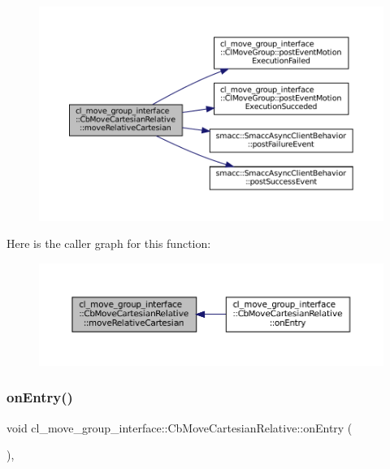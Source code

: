 \begin{figure}[H]
\begin{center}
\leavevmode
\includegraphics[width=350pt]{classcl__move__group__interface_1_1CbMoveCartesianRelative_ae8443c7f81affe5c4450e83fc665487f_cgraph}
\end{center}
\end{figure}
Here is the caller graph for this function\+:
\nopagebreak
\begin{figure}[H]
\begin{center}
\leavevmode
\includegraphics[width=350pt]{classcl__move__group__interface_1_1CbMoveCartesianRelative_ae8443c7f81affe5c4450e83fc665487f_icgraph}
\end{center}
\end{figure}
\mbox{\label{classcl__move__group__interface_1_1CbMoveCartesianRelative_a7d65e3d5fa3f2c7b47d9cbe631f448ad}} 
\subsubsection{\texorpdfstring{on\+Entry()}{onEntry()}}
{\footnotesize\ttfamily void cl\+\_\+move\+\_\+group\+\_\+interface\+::\+Cb\+Move\+Cartesian\+Relative\+::on\+Entry (\begin{DoxyParamCaption}{ }\end{DoxyParamCaption})\hspace{0.3cm}{\ttfamily [override]}, {\ttfamily [virtual]}}



